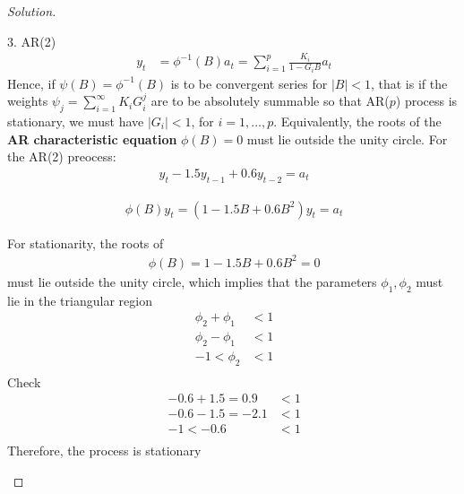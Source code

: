 \documentclass[UTF8,a4paper,14pt]{ctexart}
\newenvironment{solution}
  {\renewcommand\qedsymbol{$\blacksquare$}\begin{proof}[Solution]}
  {\end{proof}}
\theoremstyle{definition}
\theoremstyle{remark}
\begin{document}
\begin{solution}
\begin{mybox}{3. AR(2)}
    \begin{equation}\
      \begin{aligned}
        y_t &=\phi^{-1}(B) a_t = \sum_{i = 1}^{p}\frac{K_i}{1-G_i B} a_t  
      \end{aligned}
    \end{equation}
    Hence, if \(\psi(B) =\phi^{-1}(B) \) is to be convergent series for \(\left\lvert B\right\rvert<1 \), that is if the weights \(\psi_j = \sum_{i=1}^{\infty} K_i G_i^j  \) are to be absolutely summable so that AR(\(p\)) process is stationary, we must have \(\left\lvert G_i\right\rvert <1\), for \(i = 1,\ldots,p\). Equivalently, the roots of the \textbf{AR characteristic equation} \(\phi(B) = 0\) must lie outside the unity circle. 
    \tcblower
    For the AR(2) preocess:
    \begin{equation}\
      \begin{aligned}
        y_{t} - 1.5 y_{t-1} + 0.6 y_{t-2}= a_{t} 
      \end{aligned}
    \end{equation}




    \begin{equation}\
      \begin{aligned}
        \phi(B)y_t = (1-1.5B+0.6B^2)y_{t} = a_{t} 
      \end{aligned}
    \end{equation}

    For stationarity, the roots of 
    \begin{equation}\
      \begin{aligned}
        \phi(B)=1-1.5B+0.6B^2=0
      \end{aligned}
    \end{equation}
    must lie outside the unity circle, which implies that the parameters \(\phi_1, \phi_2\) must lie in the triangular region
    \begin{equation}\
      \begin{aligned}
        \phi_2+\phi_1&<1\\
        \phi_2-\phi_1&<1\\
        -1<\phi_2&<1\\
      \end{aligned}
    \end{equation}
    Check
    \begin{equation}\
      \begin{aligned}
        -0.6+1.5=0.9&<1\\
        -0.6-1.5=-2.1&<1\\
        -1<-0.6&<1\\
      \end{aligned}
    \end{equation}
    Therefore, the process is stationary
    

\end{mybox}
\end{solution}
\end{document}
